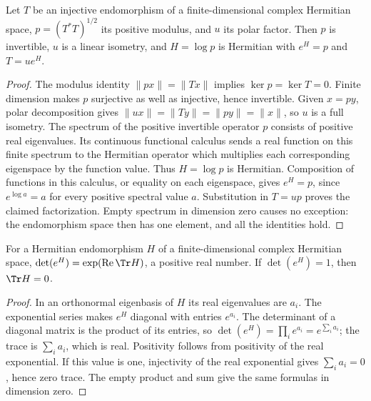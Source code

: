 \begin{lemma}
\label{lem:balanced-polar-log}
\leanok
Let $T$ be an injective endomorphism of a finite-dimensional complex
Hermitian space, $p=(T^*T)^{1/2}$ its positive modulus, and $u$ its
polar factor. Then $p$ is invertible, $u$ is a linear isometry, and
$H=\log p$ is Hermitian with $e^H=p$ and $T=ue^H$.
\end{lemma}
\begin{proof}
The modulus identity $\|px\|=\|Tx\|$ implies $\ker p=\ker T=0$.
Finite dimension makes $p$ surjective as well as injective, hence
invertible. Given $x=py$, polar decomposition gives
$\|ux\|=\|Ty\|=\|py\|=\|x\|$, so $u$ is a full isometry.
The spectrum of the positive invertible operator $p$ consists of
positive real eigenvalues. Its continuous functional calculus sends
a real function on this finite spectrum to the Hermitian operator
which multiplies each corresponding eigenspace by the function value.
Thus $H=\log p$ is Hermitian. Composition of functions in this calculus,
or equality on each eigenspace, gives $e^H=p$, since
$e^{\log a}=a$ for every positive spectral value $a$.
Substitution in $T=up$ proves the claimed factorization. Empty spectrum
in dimension zero causes no exception: the endomorphism space then
has one element, and all the identities hold.
\end{proof}

\begin{lemma}
\label{lem:balanced-hermitian-exp-determinant}
\leanok
For a Hermitian endomorphism $H$ of a finite-dimensional complex
Hermitian space, $\det(e^H)=\exp(\operatorname{Re}\Tr H)$, a positive
real number. If $\det(e^H)=1$, then $\Tr H=0$.
\end{lemma}
\begin{proof}
In an orthonormal eigenbasis of $H$ its real eigenvalues are $a_i$.
The exponential series makes $e^H$ diagonal with entries $e^{a_i}$.
The determinant of a diagonal matrix is the product of its entries,
so $\det(e^H)=\prod_i e^{a_i}=e^{\sum_i a_i}$; the trace is
$\sum_i a_i$, which is real. Positivity follows from positivity of the
real exponential. If this value is one, injectivity of the real exponential
gives $\sum_i a_i=0$, hence zero trace. The empty product and sum give
the same formulas in dimension zero.
\end{proof}

